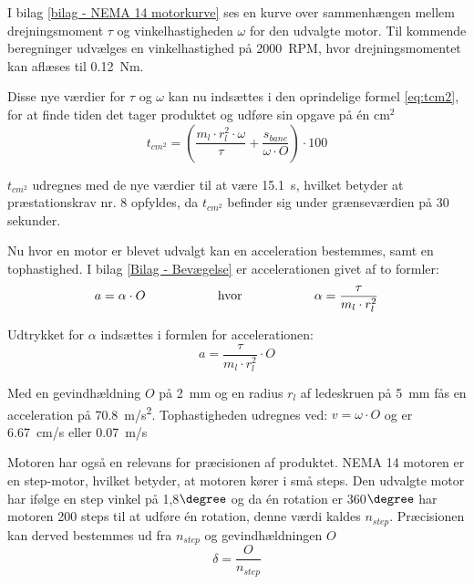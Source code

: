 I bilag \ref{bilag - NEMA 14 motorkurve} ses en kurve over sammenhængen mellem drejningsmoment \(\tau\) og vinkelhastigheden \(\omega\) for den udvalgte motor. Til kommende beregninger udvælges en vinkelhastighed på \SI{2000}{RPM}, hvor drejningsmomentet kan aflæses til \SI{0.12}{Nm}. 

Disse nye værdier for \(\tau\) og \(\omega\) kan nu indsættes i den oprindelige formel \ref{eq:tcm2}, for at finde tiden det tager produktet og udføre sin opgave på én cm\(^2\)
\begin{equation}
    t_{cm^2}=\left(\dfrac{m_{l}\cdot r_{l}^2\cdot \omega}{\tau}+\dfrac{s_{bane}}{\omega\cdot O}\right) \cdot 100
\end{equation}

\(t_{cm^2}\) udregnes med de nye værdier til at være \SI{15,1}{s}, hvilket betyder at præstationskrav nr. 8 opfyldes, da \(t_{cm^2}\) befinder sig under grænseværdien på 30 sekunder.

Nu hvor en motor er blevet udvalgt kan en acceleration bestemmes, samt en tophastighed. I bilag \ref{Bilag - Bevægelse} er accelerationen givet af to formler: \\
\begin{equation}
\begin{aligned}
a = \alpha \cdot O \hspace{20mm} \text{hvor} \hspace{20mm} \alpha = \dfrac{\tau}{m_{l}\cdot r_{l}^2}
\end{aligned}
\end{equation}

Udtrykket for \(\alpha\) indsættes i formlen for accelerationen:
\begin{equation}
    a=\dfrac{\tau}{m_{l}\cdot r_{l}^2}\cdot O
\end{equation}

Med en gevindhældning \(O\) på \SI{2}{mm} og en radius \(r_{l}\) af ledeskruen på \SI{5}{mm} fås en acceleration på \SI{70,8}{m/s^2}. Tophastigheden udregnes ved: \(v=\omega\cdot O\) og er \SI{6,67}{cm/s} eller \SI{0,07}{m/s}

Motoren har også en relevans for præcisionen af produktet. NEMA 14 motoren er en step-motor, hvilket betyder, at motoren kører i små steps. Den udvalgte motor har ifølge \parencite{Igus2025DrylinNEMA14} en step vinkel på 1,8\(\degree\) og da én rotation er 360\(\degree\) har motoren 200 steps til at udføre én rotation, denne værdi kaldes \(n_{step}\). Præcisionen kan derved bestemmes ud fra \(n_{step}\) og gevindhældningen \(O\)
\begin{equation}
    \delta=\dfrac{O}{n_{step}}
\end{equation}

